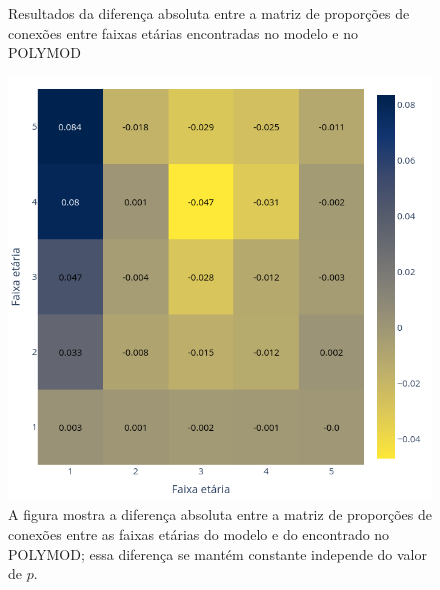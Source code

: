 \begin{figure}[H]
    \centering
    
    \captionsetup{font=normalsize,skip=0.8pt,singlelinecheck=on,labelsep=endash}
    \caption{Resultados da diferença absoluta entre a matriz de proporções de conexões entre faixas etárias encontradas no modelo e no POLYMOD}
    \includegraphics[scale= 0.4]{figuras/modelo.png}
    \captionsetup{font=small,justification=justified}
    \caption*{ A figura mostra a diferença absoluta entre a matriz de proporções de conexões entre as faixas etárias do modelo e do encontrado no POLYMOD; essa diferença se mantém constante independe do valor de $p$.}
    \label{fig:modelo}
\end{figure}

